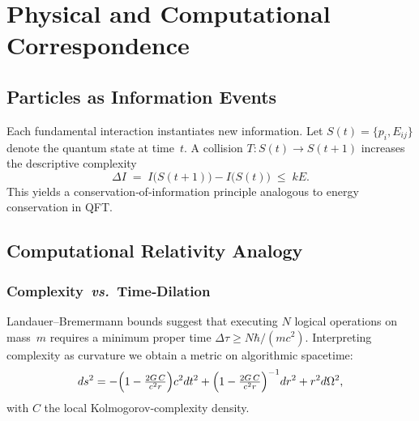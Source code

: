 
\chapter{Physical and Computational Correspondence}\label{chap:physical}

\section{Particles as Information Events}\label{sec:ppi}

Each fundamental interaction instantiates new information\cite{PPI}.  Let $S(t)=\{p_i,E_{ij}\}$ denote the quantum state at time~$t$.  A collision
$T:S(t)\to S(t+1)$ increases the descriptive complexity
\begin{equation}
  \Delta I \;=\; I\bigl(S(t+1)\bigr)-I\bigl(S(t)\bigr)
  \;\le\; k E.
\end{equation}
This yields a conservation‑of‑information principle analogous to energy conservation in QFT.

\section{Computational Relativity Analogy}\label{sec:comp-rel}

\subsection{Complexity \textit{vs.} Time‑Dilation}
Landauer–Bremermann bounds suggest that executing $N$ logical operations on mass~$m$ requires a minimum proper time $\Delta\tau\ge N\hbar/ (mc^2)$.  Interpreting complexity as curvature we obtain a metric on algorithmic spacetime:
\begin{equation}
  ds^2 = -\Bigl(1-\tfrac{2G\,C}{c^2 r}\Bigr)c^2 dt^2 + \Bigl(1-\tfrac{2G\,C}{c^2 r}\Bigr)^{-1}dr^2 + r^2 d\Omega^2,
\end{equation}
with $C$ the local Kolmogorov‑complexity density.

